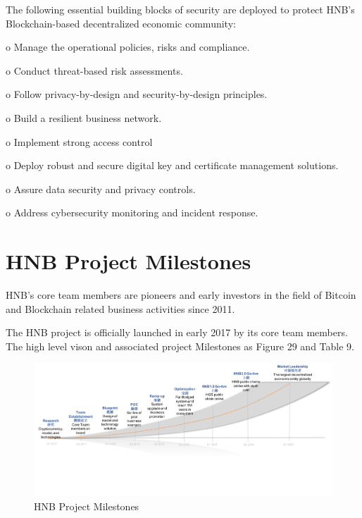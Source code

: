 \documentclass[fleqn,10pt]{SelfArx} %
\begin{document}
The following essential building blocks of security are deployed to protect HNB's Blockchain-based decentralized economic community:

o	Manage the operational policies, risks and compliance.

o	Conduct threat-based risk assessments.

o	Follow privacy-by-design and security-by-design principles.

o	Build a resilient business network.

o	Implement strong access control

o	Deploy robust and secure digital key and certificate management solutions.

o	Assure data security and privacy controls.

o	Address cybersecurity monitoring and incident response.\\






\section{HNB Project Milestones}


HNB’s core team members are pioneers and early investors in the field of Bitcoin and Blockchain related business activities since 2011. 

The HNB project is officially launched in early 2017 by its core team members. The high level vison and associated project Milestones as Figure 29 and Table 9.

\begin{figure}[!ht]\centering %
\includegraphics[width=\linewidth]{30}
\caption{HNB Project Milestones}
\label{fig:30}
\end{figure}
\end{document}
